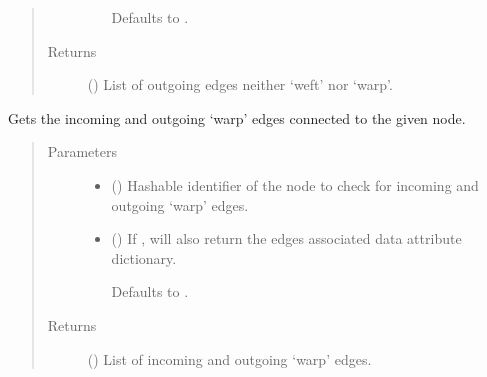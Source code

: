 \documentclass[letterpaper,10pt,english]{sphinxmanual}
\begin{document}
\begin{fulllineitems}
\begin{fulllineitems}
\begin{quote}
\begin{description}
\begin{itemize}
Defaults to .


\end{itemize}

\item[{Returns}] \leavevmode
{} () \textendash{} List of outgoing edges neither ‘weft’ nor ‘warp’.

\end{description}\end{quote}

\end{fulllineitems}


\begin{fulllineitems}
\label{\detokenize{cockatoo:cockatoo.KnitDiNetwork.node_warp_edges}}
Gets the incoming and outgoing ‘warp’ edges connected to the given
node.
\begin{quote}\begin{description}
\item[{Parameters}] \leavevmode\begin{itemize}
\item {} 
 () \textendash{} Hashable identifier of the node to check for incoming and outgoing
‘warp’ edges.

\item {} 
 (\sphinxstyleliteralemphasis{\sphinxupquote{, }}) \textendash{} 
If , will also return the edges associated data attribute
dictionary.

Defaults to .


\end{itemize}

\item[{Returns}] \leavevmode
{} () \textendash{} List of incoming and outgoing ‘warp’ edges.


\end{description}
\end{quote}
\end{fulllineitems}
\end{fulllineitems}
\end{document}
